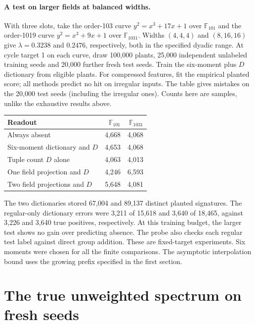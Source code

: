 \documentclass[11pt]{article}
\newcommand{\F}{\mathbb F}
\begin{document}
\paragraph{A test on larger fields at balanced widths.}
With three slots, take the order-103 curve $y^2=x^3+17x+1$ over $\F_{101}$
and the order-1019 curve $y^2=x^3+9x+1$ over $\F_{1031}$.
Widths $(4,4,4)$ and $(8,16,16)$ give $\lambda=0.3238$ and $0.2476$,
respectively, both in the specified dyadic range. At cycle target 1 on
each curve, draw 100,000 plants, 25,000 independent unlabeled training
seeds and 20,000 further fresh test seeds. Train the six-moment plus $D$
dictionary from eligible plants. For compressed features, fit the
empirical planted score; all methods predict no hit on irregular inputs.
The table gives mistakes on the 20,000 test seeds (including the irregular
ones). Counts here are samples, unlike the exhaustive results above.
\begin{center}
\begin{tabular}{lrr}
\toprule
Readout & $\F_{101}$ & $\F_{1031}$\\
\midrule
Always absent & 4,668 & 4,068\\
Six-moment dictionary and $D$ & 4,653 & 4,068\\
Tuple count $D$ alone & 4,063 & 4,013\\
One field projection and $D$ & 4,246 & 6,593\\
Two field projections and $D$ & 5,648 & 4,081\\
\bottomrule
\end{tabular}
\end{center}
The two dictionaries stored 67,004 and 89,137 distinct planted
signatures. The regular-only dictionary errors were 3,211 of 15,618
and 3,640 of 18,465, against 3,226 and 3,640 true positives,
respectively. At this training budget, the larger test shows no gain
over predicting absence. The probe also checks each regular test label
against direct group addition. These are fixed-target experiments. Six
moments were chosen for all the finite comparisons. The asymptotic
interpolation bound uses the growing prefix specified in the first section.

\section{The true unweighted spectrum on fresh seeds}
\end{document}
